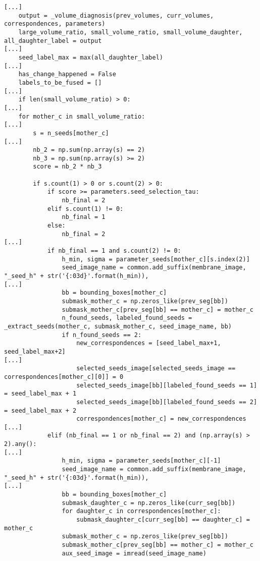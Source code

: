 \documentclass{article}
\begin{document}
\color{black}
\begin{verbatim}
[...]
    output = _volume_diagnosis(prev_volumes, curr_volumes, correspondences, parameters)
    large_volume_ratio, small_volume_ratio, small_volume_daughter, all_daughter_label = output
[...]
    seed_label_max = max(all_daughter_label)
[...]
    has_change_happened = False
    labels_to_be_fused = []
[...]
    if len(small_volume_ratio) > 0:
[...]
    for mother_c in small_volume_ratio:
[...]
        s = n_seeds[mother_c]
[...]
        nb_2 = np.sum(np.array(s) == 2)
        nb_3 = np.sum(np.array(s) >= 2)
        score = nb_2 * nb_3

        if s.count(1) > 0 or s.count(2) > 0:
            if score >= parameters.seed_selection_tau:
                nb_final = 2
            elif s.count(1) != 0:
                nb_final = 1
            else:
                nb_final = 2
[...]
            if nb_final == 1 and s.count(2) != 0:
                h_min, sigma = parameter_seeds[mother_c][s.index(2)]
                seed_image_name = common.add_suffix(membrane_image, "_seed_h" + str('{:03d}'.format(h_min)),
[...]
                bb = bounding_boxes[mother_c]
                submask_mother_c = np.zeros_like(prev_seg[bb])
                submask_mother_c[prev_seg[bb] == mother_c] = mother_c
                n_found_seeds, labeled_found_seeds = _extract_seeds(mother_c, submask_mother_c, seed_image_name, bb)
                if n_found_seeds == 2:
                    new_correspondences = [seed_label_max+1, seed_label_max+2]
[...]
                    selected_seeds_image[selected_seeds_image == correspondences[mother_c][0]] = 0
                    selected_seeds_image[bb][labeled_found_seeds == 1] = seed_label_max + 1
                    selected_seeds_image[bb][labeled_found_seeds == 2] = seed_label_max + 2
                    correspondences[mother_c] = new_correspondences
[...]
            elif (nb_final == 1 or nb_final == 2) and (np.array(s) > 2).any():
[...]
                h_min, sigma = parameter_seeds[mother_c][-1]
                seed_image_name = common.add_suffix(membrane_image, "_seed_h" + str('{:03d}'.format(h_min)),
[...]
                bb = bounding_boxes[mother_c]
                submask_daughter_c = np.zeros_like(curr_seg[bb])
                for daughter_c in correspondences[mother_c]:
                    submask_daughter_c[curr_seg[bb] == daughter_c] = mother_c
                submask_mother_c = np.zeros_like(prev_seg[bb])
                submask_mother_c[prev_seg[bb] == mother_c] = mother_c
                aux_seed_image = imread(seed_image_name)

\end{verbatim}
\end{document}
